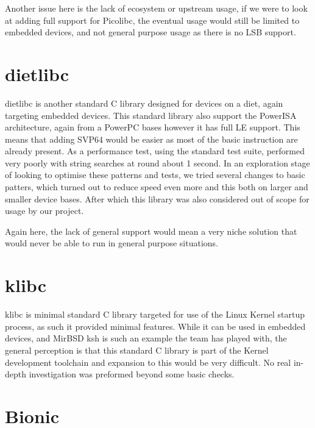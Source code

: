 Another issue here is the lack of ecosystem or upstream usage, if we were to look at adding full support for Picolibc,
the eventual usage would still be limited to embedded devices, and not general purpose usage as there is no \acrfull{LSB} support.
\par

\section{dietlibc}

dietlibc is another standard C library designed for devices on a diet, again targeting embedded devices.
This standard library also support the PowerISA architecture, again from a PowerPC bases however it has full \acrfull{LE} support.
This means that adding \acrshort{SVP64} would be easier as most of the basic instruction are already present.
As a performance test, using the standard test suite, performed very poorly with string searches at round about 1 second.
In an exploration stage of looking to optimise these patterns and tests, we tried several changes to basic patters,
which turned out to reduce speed even more and this both on larger and smaller device bases.
After which this library was also considered out of scope for usage by our project.
\par

Again here, the lack of general support would mean a very niche solution that would never be able to run in general purpose situations.
\par

\section{klibc}
\label{content:klibc}

klibc is minimal standard C library targeted for use of the Linux Kernel startup process, as such it provided minimal features.
While it can be used in embedded devices, and MirBSD ksh is such an example the team has played with,
the general perception is that this standard C library is part of the Kernel development toolchain and expansion to this would be very difficult.
No real in-depth investigation was preformed beyond some basic checks.
\par

\section{Bionic}

